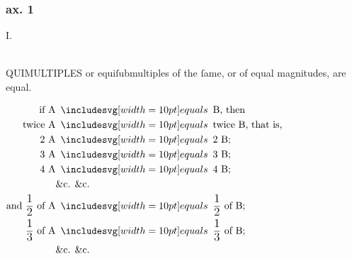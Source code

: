 \begin{center}
  \begin{minipage}{0.80\textwidth}
    \subsubsection{ax. 1}
    \begin{center}
      I.\label{book5ax1}\\
      \hfill\\
      \raggedright \lettrine[lines=3, loversize=1, nindent=0pt]{}{}QUIMULTIPLES or equiſubmultiples of the ſame, or of equal magnitudes, are equal.
    \end{center}

    \hfill

    \centering

    $\begin{aligned}
        \text{if A}                                                       & \bequals \text{B, then}                                         \\
        \text{twice A}                                                    & \bequals \text{twice B, that is,}                               \\
        \text{2 A}                                                        & \bequals \text{2 B;}                                            \\
        \text{3 A}                                                        & \bequals \text{3 B;}                                            \\
        \text{4 A}                                                        & \bequals \text{4 B;}                                            \\
                                                                          & \text{\&c. \&c.}                                                \\
        \text{and } \dfrac{\text{\large 1}}{\text{\large 2}} \text{ of A} & \bequals \dfrac{\text{\large 1}}{\text{\large 2}} \text{ of B;} \\
        \dfrac{\text{\large 1}}{\text{\large 3}} \text{ of A}             & \bequals \dfrac{\text{\large 1}}{\text{\large 3}} \text{ of B;} \\
                                                                          & \text{\&c. \&c.}
      \end{aligned}$\\


\end{minipage}
\end{center}
